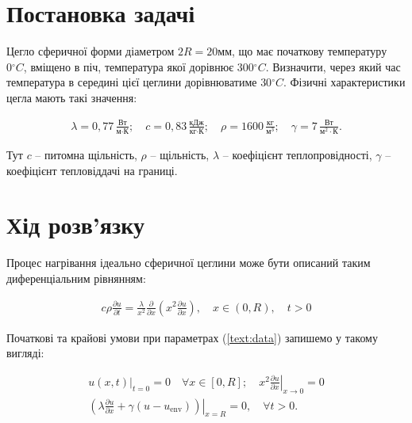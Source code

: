 \section{Постановка задачі}

Цегло сферичної форми діаметром \( 2R = 20\text{мм}\), що має початкову температуру \(0 {^\circ}C\), вміщено в піч, температура якої дорівнює \(300 {^\circ}C\). Визначити, через який час температура в середині цієї цеглини дорівнюватиме \(30 {^\circ}C\). Фізичні характеристики цегла мають такі значення:

\begin{equation}
\begin{multlined} \label{text:data}
\lambda = 0,77 \,\frac{\text{Вт}}{\text{м}\cdot\text{К}}; \quad c = 0,83 \,\frac{\text{кДж}}{\text{кг}\cdot\text{К}}; \quad \rho = 1600 \,\frac{\text{кг}}{\text{м}^3}; \quad \gamma = 7 \,\frac{\text{Вт}}{\text{м}^2 \cdot \text{К}}.
\end{multlined}
\end{equation}

Тут \(c\) -- питомна щільність, \(\rho\) -- щільність, \(\lambda\) -- коефіцієнт теплопровідності, \(\gamma\) -- коефіцієнт тепловіддачі на границі.

\section{Хід розв'язку}

Процес нагрівання ідеально сферичної цеглини може бути описаний таким диференціальним рівнянням:

\begin{equation}
\begin{multlined} \label{init:problem}
c\rho\frac{\partial u}{\partial t} = \frac{\lambda}{x^2}\frac{\partial}{\partial{x}}\left(x^2\frac{\partial{u}}{\partial{x}}\right), \quad x \in (0, R), \quad t > 0
\end{multlined}
\end{equation}

Початкові та крайові умови при параметрах (\ref{text:data}) запишемо у такому вигляді:

\begin{equation}
\begin{split} \label{init:conditions}
\left.u(x, t)\right|_{t = 0} = 0 \quad \forall x \in [0, R]; \quad \left.x^2\frac{\partial{u}}{\partial{x}}\right|_{x \rightarrow 0} = 0\\ 
\left.\left(\lambda\frac{\partial{u}}{\partial{x}} + \gamma(u - u_\text{env})\right)\right|_{x=R} = 0, \quad \forall t > 0.
\end{split}
\end{equation}


